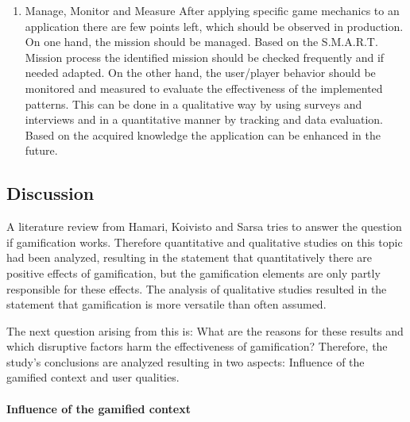 \begin{enumerate}
	\item Manage, Monitor and Measure \newline
	After applying specific game mechanics to an application there are few points left, which should be observed in production. On one hand, the mission should be managed. Based on the S.M.A.R.T. Mission process the identified mission should be checked frequently and if needed adapted. On the other hand, the user/player behavior should be monitored and measured to evaluate the effectiveness of the implemented patterns. This can be done in a qualitative way by using surveys and interviews and in a quantitative manner by tracking and data evaluation. Based on the acquired knowledge the application can be enhanced in the future.	\cite[p. 92-96]{kumarGamificationWorkDesigning2013}
\end{enumerate}

\newpage

\subsection{Discussion}
\label{sec:theoryBe}

A literature review from Hamari, Koivisto and Sarsa \cite{hamariDoesGamificationWork2014} tries to answer the question if gamification works. Therefore quantitative and qualitative studies on this topic had been analyzed, resulting in the statement that quantitatively there are positive effects of gamification, but the gamification elements are only partly responsible for these effects. The analysis of qualitative studies resulted in the statement that gamification is more versatile than often assumed. \cite[p. 3029, 3030]{hamariDoesGamificationWork2014} 

The next question arising from this is: What are the reasons for these results and which disruptive factors harm the effectiveness of gamification? Therefore, the study's conclusions are analyzed resulting in two aspects: Influence of the gamified context and user qualities. \cite[p. 3029, 3030]{hamariDoesGamificationWork2014}

\paragraph*{Influence of the gamified context}

